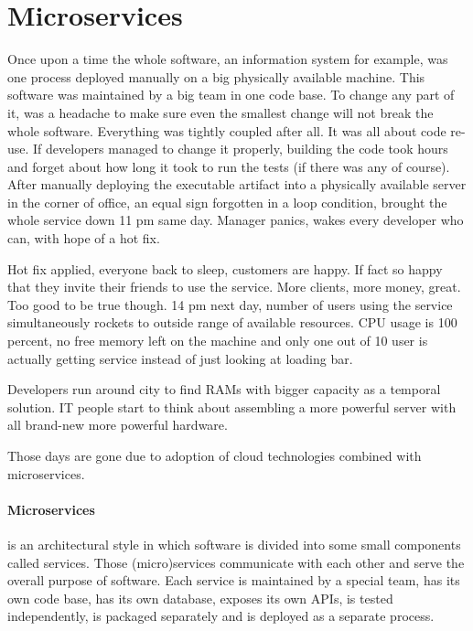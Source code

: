 \documentclass[a4]{report}
\begin{document}
    \section{Microservices}
    Once upon a time the whole software, an information system for example, was one process deployed manually on a big
    physically available machine.
    This software was maintained by a big team in one code base.
    To change any part of it, was a headache to make sure even the smallest change will not break the whole software.
    Everything was tightly coupled after all.
    It was all about code re-use.
    If developers managed to change it properly, building the code took hours and forget about how long it took to
    run the tests (if there was any of course).
    After manually deploying the executable artifact into a physically available server in the corner of office, an
    equal sign forgotten in a loop condition, brought the whole service down 11 pm same day.
    Manager panics, wakes every developer who can, with hope of a hot fix.

    Hot fix applied, everyone back to sleep, customers are happy.
    If fact so happy that they invite their friends to use the service.
    More clients, more money, great.
    Too good to be true though.
    14 pm next day, number of users using the service simultaneously rockets to outside range of available resources.
    CPU usage is 100 percent, no free memory left on the machine and only one out of 10 user is actually getting
    service instead of just looking at loading bar.

    Developers run around city to find RAMs with bigger capacity as a temporal solution.
    IT people start to think about assembling a more powerful server with all brand-new more powerful hardware.

    Those days are gone due to adoption of cloud technologies combined with microservices.

    \paragraph{Microservices} is an architectural style in which software is divided into some small components
    called services.
    Those (micro)services communicate with each other and serve the overall purpose of software.
    Each service is maintained by a special team, has its own code base, has its own database, exposes its own APIs, is
    tested independently, is packaged separately and is deployed as a separate process.
\end{document}

